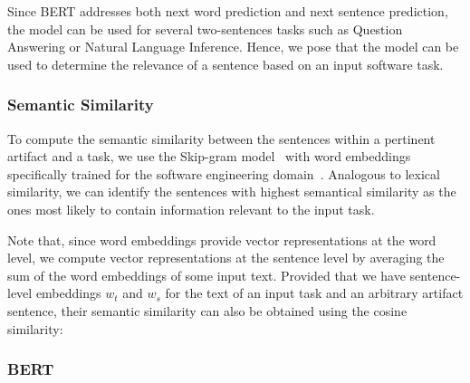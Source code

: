 Since BERT addresses both next word prediction and next sentence prediction, the model can be used for several two-sentences tasks such as  Question Answering or Natural Language Inference. Hence, we pose that the model can be used to determine the relevance of a sentence based on an input software task.





\subsubsection{Semantic Similarity}






To compute the semantic similarity between the sentences within a pertinent artifact and a task,
we use the Skip-gram model~\cite{Mikolov2013} with word embeddings specifically trained for the software engineering domain~\cite{Efstathiou2018}.
Analogous to lexical similarity,  we can identify the sentences with highest semantical similarity 
as the ones most likely to contain information relevant to the input task.



Note that, since word embeddings provide vector representations at the word level, we compute vector representations 
at the sentence level by averaging the sum of the word embeddings of some input text.
Provided that we have sentence-level embeddings $w_t$ and $w_s$ for the text 
of an input task and an arbitrary artifact sentence, 
their semantic similarity can also be obtained 
using the cosine similarity: 





\subsubsection{BERT}











